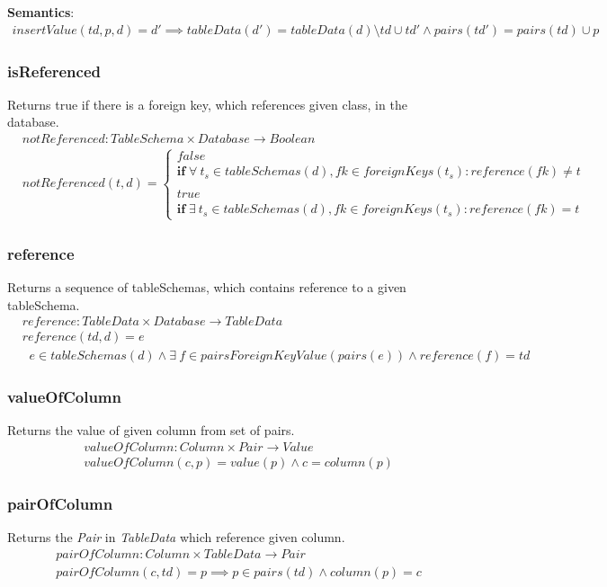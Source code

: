 \documentclass[10pt]{article}
\begin{document}
\textbf{Semantics}:
\begin{align}
insertValue(td, p, d) = d' \implies tableData(d') = tableData(d) \setminus td \cup td' \land pairs(td') = pairs(td) \cup p 
\end{align}


\subsubsection{isReferenced}
Returns true if there is a foreign key, which references given class, in the database.
\begin{align}
& notReferenced: TableSchema \times Database \rightarrow Boolean \\
& notReferenced(t, d) = \begin{cases}
 false \\
 \mathbf{if} \; \forall \: t_s \in tableSchemas(d), fk \in foreignKeys(t_s) : reference(fk) \neq t \\\\
 true \\
 \mathbf{if} \;  \exists \:  t_s \in tableSchemas(d), fk \in foreignKeys(t_s) : reference(fk) = t
 \end{cases}
\end{align}

\subsubsection{reference}
Returns a sequence of tableSchemas, which contains reference to a given tableSchema.
\begin{align}
& reference: TableData \times Database \rightarrow TableData \\
& reference(td, d) = e \\
& \;\; e \in tableSchemas(d) \land \exists \:  f \in pairsForeignKeyValue(pairs(e)) \land reference(f) = td  
\end{align}


\subsubsection{valueOfColumn}
Returns the value of given column from set of pairs.
\begin{align}
& valueOfColumn: Column \times Pair \rightarrow Value \\
& valueOfColumn(c, p) = value(p) \land c = column(p)
\end{align}

\subsubsection{pairOfColumn}
Returns the \emph{Pair} in \emph{TableData} which reference given column.
\begin{align}
& pairOfColumn: Column \times TableData \rightarrow Pair \\
& pairOfColumn(c, td) = p \implies p \in pairs(td) \land column(p) = c
\end{align}
\end{document}
